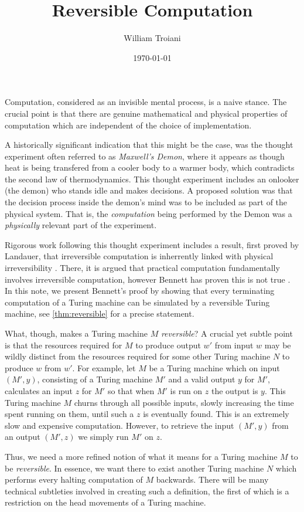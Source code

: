 \documentclass[12pt]{article}
\title{Reversible Computation}
\author{William Troiani}
\date{\today}
\theoremstyle{plain}
\theoremstyle{definition}
\begin{document}
	\maketitle
	
	Computation, considered as an invisible mental process, is a naive stance. The crucial point is that there are genuine mathematical and physical properties of computation which are independent of the choice of implementation.
	
	A historically significant indication that this might be the case, was the thought experiment often referred to as \emph{Maxwell's Demon}, where it appears as though heat is being transfered from a cooler body to a warmer body, which contradicts the second law of thermodynamics. This thought experiment includes an onlooker (the demon) who stands idle and makes decisions. A proposed solution was that the decision process inside the demon's mind was to be included as part of the physical system. That is, the \emph{computation} being performed by the Demon was a \emph{physically} relevant part of the experiment.
	
	Rigorous work following this thought experiment includes a result, first proved by Landauer, that irreversible computation is inherrently linked with physical irreversibility \cite{Landauer}. There, it is argued that practical computation fundamentally involves irreversible computation, however Bennett has proven this is not true \cite{Bennett}. In this note, we present Bennett's proof by showing that every terminating computation of a Turing machine can be simulated by a reversible Turing machine, see \ref{thm:reversible} for a precise statement.
	
	What, though, makes a Turing machine $M$ \emph{reversible}? A crucial yet subtle point is that the resources required for $M$ to produce output $w'$ from input $w$ may be wildly distinct from the resources required for some other Turing machine $N$ to produce $w$ from $w'$. For example, let $M$ be a Turing machine which on input $(M', y)$, consisting of a Turing machine $M'$ and a valid output $y$ for $M'$, calculates an input $z$ for $M'$ so that when $M'$ is run on $z$ the output is $y$. This Turing machine $M$ churns through all possible inputs, slowly increasing the time spent running on them, until such a $z$ is eventually found. This is an extremely slow and expensive computation. However, to retrieve the input $(M',y)$ from an output $(M',z)$ we simply run $M'$ on $z$.
	
	Thus, we need a more refined notion of what it means for a Turing machine $M$ to be \emph{reversible}. In essence, we want there to exist another Turing machine $N$ which performs every halting computation of $M$ backwards. There will be many technical subtleties involved in creating such a definition, the first of which is a restriction on the head movements of a Turing machine.
		
\end{document}
